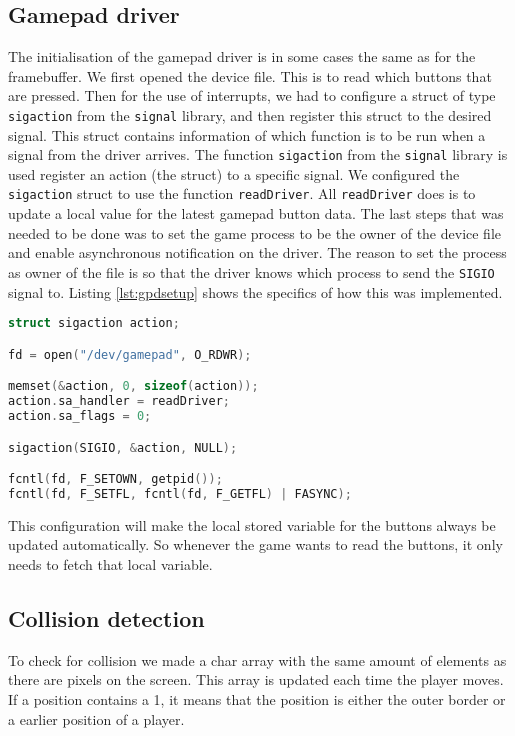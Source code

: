 \subsection{Gamepad driver} \label{ssec:gamepaddriver}
The initialisation of the gamepad driver is in some cases the same as for the framebuffer. We first opened the device file. This is to read which buttons that are pressed. Then for the use of interrupts, we had to configure a struct of type \texttt{sigaction} from the \texttt{signal} library, and then register this struct to the desired signal. This struct contains information of which function is to be run when a signal from the driver arrives. The function \texttt{sigaction} from the \texttt{signal} library is used register an action (the struct) to a specific signal. We configured the \texttt{sigaction} struct to use the function \texttt{readDriver}. All \texttt{readDriver} does is to update a local value for the latest gamepad button data. The last steps that was needed to be done was to set the game process to be the owner of the device file and enable asynchronous notification on the driver. The reason to set the process as owner of the file is so that the driver knows which process to send the \texttt{SIGIO} signal to. Listing \ref{lst:gpdsetup} shows the specifics of how this was implemented.

\begin{minipage}{\linewidth}
\begin{lstlisting}[language=c, label=lst:gpdsetup, caption=Setup of the gamepad driver.]
struct sigaction action;

fd = open("/dev/gamepad", O_RDWR);

memset(&action, 0, sizeof(action));
action.sa_handler = readDriver;
action.sa_flags = 0;

sigaction(SIGIO, &action, NULL);

fcntl(fd, F_SETOWN, getpid());
fcntl(fd, F_SETFL, fcntl(fd, F_GETFL) | FASYNC);
\end{lstlisting}
\end{minipage}

This configuration will make the local stored variable for the buttons always be updated automatically. So whenever the game wants to read the buttons, it only needs to fetch that local variable.

\subsection{Collision detection} \label{ssec:collision}
To check for collision we made a char array with the same amount of elements as there are pixels on the screen. This array is updated each time the player moves. If a position contains a 1, it means that the position is either the outer border or a earlier position of a player. 

